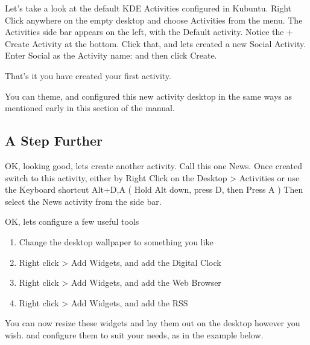\documentclass[letterpaper,10pt,english]{sphinxmanual}
\begin{document}
Let's take a look at the default KDE Activities configured in Kubuntu. Right Click anywhere on the empty desktop and choose \sphinxquotedblleft{}Activities\sphinxquotedblright{} from the menu. The Activities side bar appears on the left, with the Default activity. Notice the + Create Activity at the bottom. Click that, and lets created a new \sphinxquotedblleft{}Social\sphinxquotedblright{} Activity.
Enter \sphinxquotedblleft{}Social\sphinxquotedblright{} as the Activity name: and then click Create.

That's it you have created your first activity.

You can theme, and configured this new activity desktop in the same ways as mentioned early in this section of the manual.


\subsection{A Step Further}
\label{\detokenize{docs/basic:a-step-further}}
OK, looking good, lets create another activity. Call this one \sphinxquotedblleft{}News\sphinxquotedblright{}. Once created switch to this activity, either by Right Click on the Desktop \textgreater{} Activities or use the Keyboard shortcut Alt+D,A ( Hold Alt down, press D, then Press A )
Then select the News activity from the side bar.

OK, lets configure a few useful tools
\begin{enumerate}
\item {} 
Change the desktop wallpaper to something you like

\item {} 
Right click \textgreater{} Add Widgets, and add the Digital Clock

\item {} 
Right click \textgreater{} Add Widgets, and add the Web Browser

\item {} 
Right click \textgreater{} Add Widgets, and add the RSS

\end{enumerate}

You can now resize these widgets and lay them out on the desktop however you wish. and configure them to suit your needs, as in the example below.

\end{document}
